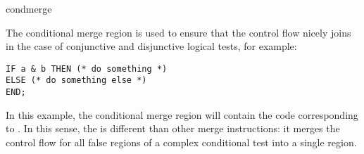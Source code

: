 \begin{instruction}{condmerge}

  \begin{notes}
    The conditional merge region is used to ensure that the control
    flow nicely joins in the case of conjunctive and disjunctive
    logical tests, for example:

\begin{verbatim}
IF a & b THEN (* do something *)
ELSE (* do something else *)
END;
\end{verbatim}

    In this example, the conditional merge region will contain the
    code corresponding to .  In this
    sense, the  is different than other merge
    instructions: it merges the control flow for all false regions of
    a complex conditional test into a single region.
  \end{notes}

  \nresults

  \begin{operands}
  \item {}
  \item {}
  \end{operands}

  \begin{seealso}
  \end{seealso}
\end{instruction}

